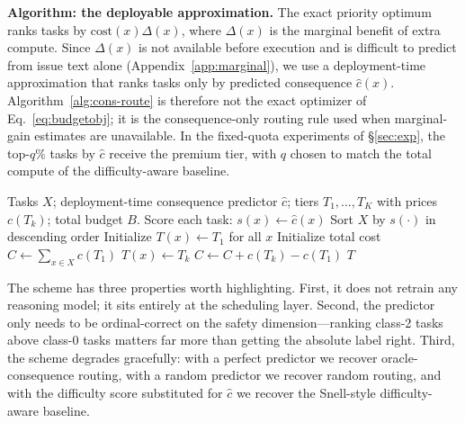 \documentclass{article}
\begin{document}
\textbf{Algorithm: the deployable approximation.} The exact priority
optimum ranks tasks by $\mathrm{cost}(x)\Delta(x)$, where
$\Delta(x)$ is the marginal benefit of extra compute. Since
$\Delta(x)$ is not available before execution and is difficult to
predict from issue text alone (Appendix~\ref{app:marginal}), we use a
deployment-time approximation that ranks tasks only by predicted
consequence $\hat{c}(x)$. Algorithm~\ref{alg:cons-route} is therefore
not the exact optimizer of Eq.~\ref{eq:budgetobj}; it is the
consequence-only routing rule used when marginal-gain estimates are
unavailable. In the fixed-quota experiments of \S\ref{sec:exp}, the
top-$q\%$ tasks by $\hat{c}$ receive the premium tier, with $q$ chosen
to match the total compute of the difficulty-aware baseline.

\begin{algorithm}
\caption{Deployable consequence-only compute allocation}
\label{alg:cons-route}
\begin{algorithmic}[1]
\REQUIRE Tasks $X$; deployment-time consequence predictor $\hat{c}$;
tiers $T_1,\ldots,T_K$ with prices $c(T_k)$; total budget $B$.
\STATE Score each task: $s(x) \leftarrow \hat{c}(x)$
\STATE Sort $X$ by $s(\cdot)$ in descending order
\STATE Initialize $T(x) \leftarrow T_1$ for all $x$
\STATE Initialize total cost $C \leftarrow \sum_{x\in X} c(T_1)$
      \STATE $T(x) \leftarrow T_k$
      \STATE $C \leftarrow C + c(T_k) - c(T_1)$
    \ENDIF
  \ENDFOR
\ENDFOR
\RETURN $T$
\end{algorithmic}
\end{algorithm}
The scheme has three properties worth highlighting. First, it does
not retrain any reasoning model; it sits entirely at the scheduling
layer. Second, the predictor only needs to be ordinal-correct
on the safety dimension---ranking class-2 tasks above class-0 tasks
matters far more than getting the absolute label right. Third, the
scheme degrades gracefully: with a perfect predictor we recover
oracle-consequence routing, with a random predictor we recover random
routing, and with the difficulty score substituted for $\hat{c}$ we
recover the Snell-style difficulty-aware baseline.
\end{document}

